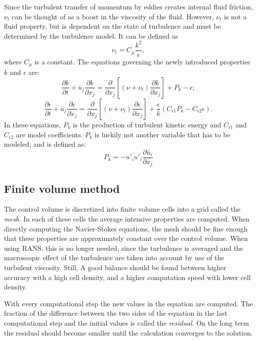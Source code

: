 Since the turbulent transfer of momentum by eddies creates internal fluid friction, $\nu_t$ can be thought of as a boost in the viscosity of the fluid. However, $\nu_t$ is not a fluid property, but is dependent on the state of turbulence and must be determined by the turbulence model. It can be defined as 
\begin{equation}\label{eq:NU}
\nu_t = C_\mu\frac{k^2}{\epsilon},
\end{equation}
where $C_\mu$ is a constant. The equations governing the newly introduced properties $k$ and $\epsilon$ are:
\begin{equation}\label{eq:ke1}
\frac{\partial k}{\partial t} + \bar{u}_j\frac{\partial k}{\partial x_j} = \frac{\partial}{\partial x_j} \left[(\nu + \nu_t) \frac{\partial k }{\partial x_j}\right] + P_k - \epsilon;
\end{equation}
\begin{equation}\label{eq:ke2}
\frac{\partial \epsilon}{\partial t} + \bar{u}_j\frac{\partial \epsilon}{\partial x_j} = \frac{\partial}{\partial x_j} \left[(\nu + \nu_t) \frac{\partial \epsilon}{\partial x_j}\right] + \frac{\epsilon}{k}(C_{\epsilon 1}P_k - C_{\epsilon 2}\epsilon).
\end{equation}
In these equations, $P_k$ is the production of turbulent kinetic energy and $C_{\epsilon 1}$ and $C_{\epsilon 2}$ are model coefficients. $P_k$ is luckily not another variable that has to be modeled, and is defined as:
\begin{equation}\label{eq:P}
P_k=-\overline{u'_iu'_i}\frac{\partial \bar{u}_i}{\partial x_j}
\end{equation}

\subsection{Finite volume method}

The control volume is discretized into finite volume cells into a grid called the \emph{mesh}. In each of these cells the average intensive properties are computed. When directly computing the Navier-Stokes equations, the mesh should be fine enough that these properties are approximately constant over the control volume. When using RANS, this is no longer needed, since the turbulence is averaged and the macroscopic effect of the turbulence are taken into account by use of the turbulent viscosity. Still, A good balance should be found between higher accuracy with a high cell density, and a higher computation speed with lower cell density. 

With every computational step the new values in the equation are computed. The fraction of the difference between the two sides of the equation in the last computational step and the initial values is called the \emph{residual}. On the long term the residual should become smaller until the calculation converges to the solution. 